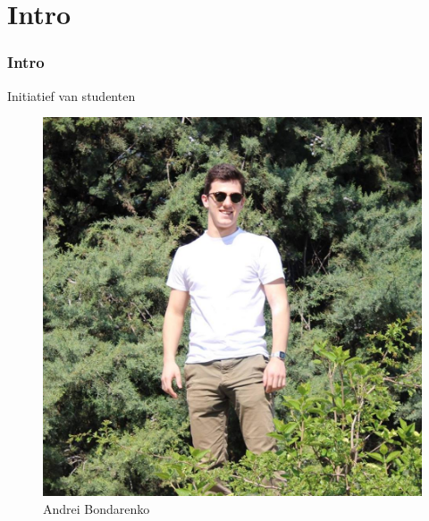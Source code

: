 

\section{Intro}
\addtocounter{minutes}{2}
\begin{frame}
	\frametitle{Intro} 
    Initiatief van studenten
    
    \begin{figure}
       	\begin{minipage}{0.3\linewidth}
            \centering
           	\includegraphics[width=\linewidth]{res/andrei} \\
           	\footnotesize Andrei Bondarenko
        \end{minipage}
        \begin{minipage}{0.3\linewidth}
           	\centering

\end{minipage}
\end{figure}
\end{frame}
